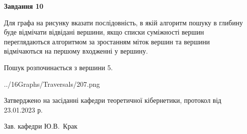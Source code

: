 \documentclass[12pt, ukrainian]{article}
\begin{document}
{\begin {large}
{\begin {center}\textbf{Завдання 10}\end {center}}\par
Для графа на рисунку вказати послідовність, в якій алгоритм пошуку в глибину буде відмічати відвідані вершини, якщо списки суміжності вершин переглядаються алгоритмом за зростанням міток вершин та вершини відмічаються на першому вход\-женні у вершину.\par
Пошук розпочинається з вершини 5.\par

\begin{center}
	{../16Graphs/Traversals/207.png}
\end{center}\par
\newpage


\end {large}
}
{\smallskip \begin {small} Затверджено на засіданні кафедри теоретичної кібернетики, протокол  від   23.01.2023 р.\par\smallskip\smallskip
{\parbox {6.5 cm}{Зав. кафедри \dotfill Ю.В.~Крак}} \end{small}}
\end{document}
